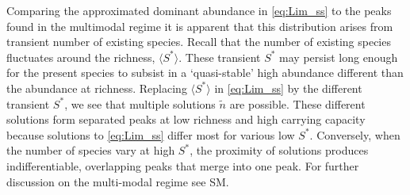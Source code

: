 \documentclass[9pt,twocolumn,twoside,lineno]{pnas-new}
\begin{document}
Comparing the approximated dominant abundance in \eqref{eq:Lim_ss} to the peaks found in the multimodal regime it is apparent that this distribution arises from transient number of existing species. 
Recall that the number of existing species fluctuates around the richness, $\langle S^* \rangle$. 
These transient $S^*$ may persist long enough for the present species to subsist in a `quasi-stable' high abundance different than the abundance at richness.
Replacing $\langle S^* \rangle$  in \eqref{eq:Lim_ss} by the different transient $S^*$, we see that multiple solutions $\tilde{n}$ are possible.
These different solutions form separated peaks at low richness and high carrying capacity because solutions to \eqref{eq:Lim_ss} differ most for various low $S^*$.
Conversely, when the number of species vary at high $S^*$, the proximity of solutions produces indifferentiable, overlapping peaks that merge into one peak. 
For further discussion on the multi-modal regime see SM.  
  
\end{document}
